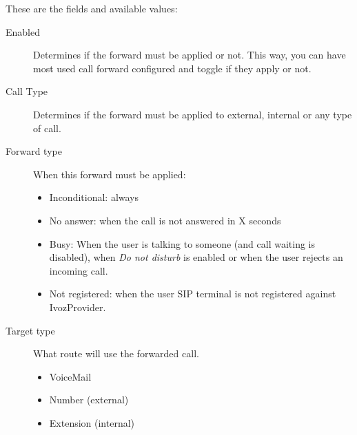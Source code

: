 \documentclass[letterpaper,10pt,english]{sphinxmanual}
\begin{document}
\label{pbx_features/users:fwd-to-vm}
These are the fields and available values:
\begin{description}
\item[{Enabled}] \leavevmode{}\label{pbx_features/users:term-enabled}
Determines if the forward must be applied or not. This way, you can have
most used call forward configured and toggle if they apply or not.

\item[{Call Type}] \leavevmode{}\label{pbx_features/users:term-call-type}
Determines if the forward must be applied to external, internal or any
type of call.

\item[{Forward type}] \leavevmode{}\label{pbx_features/users:term-forward-type}
When this forward must be applied:
\begin{itemize}
\item {} 
Inconditional: always

\item {} 
No answer: when the call is not answered in X seconds

\item {} 
Busy: When the user is talking to someone (and call waiting is
disabled), when \emph{Do not disturb} is enabled or when the user
rejects an incoming call.

\item {} 
Not registered: when the user SIP terminal is not registered
against IvozProvider.

\end{itemize}

\item[{Target type}] \leavevmode{}\label{pbx_features/users:term-target-type}
What route will use the forwarded call.
\begin{itemize}
\item {} 
VoiceMail

\item {} 
Number (external)

\item {} 
Extension (internal)

\end{itemize}

\end{description}
\end{document}
